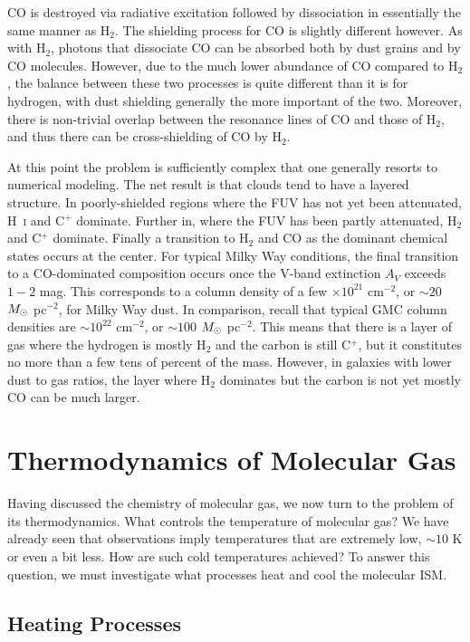 CO is destroyed via radiative excitation followed by dissociation in essentially the same manner as H$_2$. The shielding process for CO is slightly different however. As with H$_2$, photons that dissociate CO can be absorbed both by dust grains and by CO molecules. However, due to the much lower abundance of CO compared to H$_2$, the balance between these two processes is quite different than it is for hydrogen, with dust shielding generally the more important of the two. Moreover, there is non-trivial overlap between the resonance lines of CO and those of H$_2$, and thus there can be cross-shielding of CO by H$_2$.

At this point the problem is sufficiently complex that one generally resorts to numerical modeling. The net result is that clouds tend to have a layered structure. In poorly-shielded regions where the FUV has not yet been attenuated, H~\textsc{i} and C$^+$ dominate. Further in, where the FUV has been partly attenuated, H$_2$ and C$^+$ dominate. Finally a transition to H$_2$ and CO as the dominant chemical states occurs at the center. For typical Milky Way conditions, the final transition to a CO-dominated composition occurs once the V-band extinction $A_V$ exceeds $1-2$ mag. This corresponds to a column density of a few $\times 10^{21}$ cm$^{-2}$, or $\sim 20$ $M_{\odot}$ pc$^{-2}$, for Milky Way dust. In comparison, recall that typical GMC column densities are $\sim 10^{22}$ cm$^{-2}$, or $\sim 100$ $M_{\odot}$ pc$^{-2}$. This means that there is a layer of gas where the hydrogen is mostly H$_2$ and the carbon is still C$^+$, but it constitutes no more than a few tens of percent of the mass. However, in galaxies with lower dust to gas ratios, the layer where H$_2$ dominates but the carbon is not yet mostly CO can be much larger.

\section{Thermodynamics of Molecular Gas}

Having discussed the chemistry of molecular gas, we now turn to the problem of its thermodynamics. What controls the temperature of molecular gas? We have already seen that observations imply temperatures that are extremely low, $\sim 10$ K or even a bit less. How are such cold temperatures achieved? To answer this question, we must investigate what processes heat and cool the molecular ISM.

\subsection{Heating Processes}
\label{ssec:heatproc}

